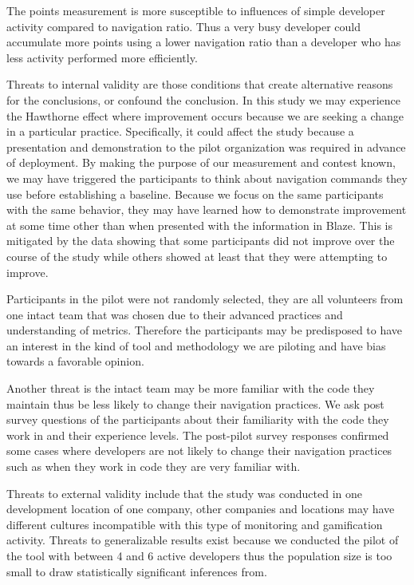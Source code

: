\documentclass{sig-alternate}
\begin{document}
The points measurement is more susceptible to influences of simple developer activity compared to navigation ratio.  Thus a very busy developer could accumulate more points using a lower navigation ratio than a developer who has less activity performed more efficiently.  

Threats to internal validity are those conditions that create alternative reasons for the conclusions, or confound the conclusion.  
In this study we may experience the Hawthorne effect where improvement occurs because we are seeking a change in a particular practice.  Specifically, it could affect the study because a presentation and demonstration to the pilot organization was required in advance of deployment.  By making the purpose of our measurement and contest known,  we may have triggered the participants to think about navigation commands they use before establishing a baseline.  Because we focus on the same participants with the same behavior, they may have learned how to demonstrate improvement at some time other than when presented with the information in Blaze.  This is mitigated by the data showing that some participants did not improve over the course of the study while others showed at least that they were attempting to improve.

Participants in the pilot were not randomly selected, they are all volunteers from one intact team that was chosen due to their advanced practices and understanding of metrics.  Therefore the participants may be predisposed to have an interest in the kind of tool and methodology we are piloting and have bias towards a favorable opinion.  

Another threat is the intact team may be more familiar with the code they maintain thus be less likely to change their navigation practices.  We ask post survey questions of the participants about their familiarity with the code they work in and their experience levels.   The post-pilot survey responses confirmed some cases where developers are not likely to change their navigation practices such as when they work in code they are very familiar with.  

Threats to external validity include that the study was conducted in one development location of one company, other companies and locations may have different cultures incompatible with this type of monitoring and gamification activity.
 Threats to generalizable results exist because we conducted the pilot of the tool with between 4 and 6 active developers thus the population size is too small to draw statistically significant inferences from. 
\end{document}
